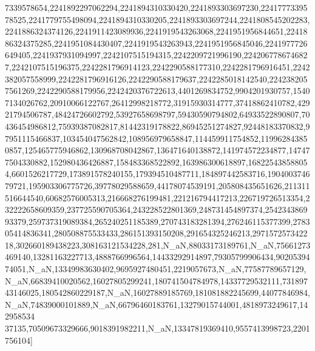 7339578654,2241892297062294,2241894310330420,2241893303697230,2241777339578525,2241779755498094,2241894310330205,2241893303697244,2241808545202283,2241886324374126,2241911423089936,2241919543263068,2241951956844651,2241886324375285,2241951084430407,2241919543263943,2241951956845046,2241977726649405,2241937931094997,2242107515194315,2242209721996190,2242067786746827,2242107515196375,2242281796914123,2242290588177310,2242281796916451,2242382057558999,2242281796916126,2242290588179637,2242285018142540,2242382057561269,2242290588179956,2242420376722613,4401269834752,9904201930757,15407134026762,20910066122767,26412998218772,31915930314777,37418862410782,42921794506787,48424726602792,53927658698797,59430590794802,64933522890807,70436454986812,75939387082817,81442319178822,86945251274827,92448183370832,97951115466837,103454047562842,108956979658847,114459911754852,119962843850857,125465775946862,130968708042867,136471640138872,141974572234877,147477504330882,152980436426887,158483368522892,163986300618897,168225438588054,6601526217729,173891578240155,179394510487711,184897442583716,190400374679721,195903306775726,39778029588659,44178074539191,205808435651626,211311516644540,60682576005313,216668276199481,221216794417213,226719726513354,232222658609359,237725590705364,243228522801369,248731454897374,254234386993379,259737319089384,265240251185389,270743183281394,276246115377399,278305414836341,280508875533433,286151393150208,291654325246213,297157257342218,302660189438223,308163121534228,281,N_{aN},88033173189761,N_{aN},75661273469140,13281163227713,4888766996564,14433292914897,79305799906434,9020539474051,N_{aN},13349983630402,9695927480451,2219057673,N_{aN},77587789657129,N_{aN},66839410020562,16027805299241,180741504784978,14337729532111,73189743146025,180542860229187,N_{aN},16027889185769,181081882245699,44077846984,N_{aN},74839000101889,N_{aN},66796460183761,13279015744001,4818973249617,142958534 37135,70509673329666,9018391982211,N_{aN},13347819369410,9557413998723,2201756104\right]